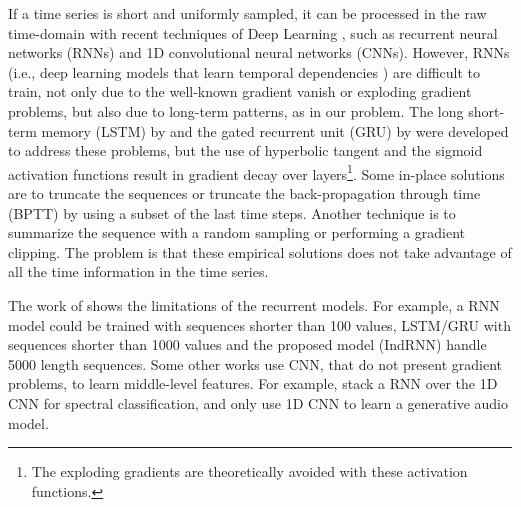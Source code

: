 If a time series is short and uniformly sampled, it can be processed in the raw time-domain with recent techniques of Deep Learning \citep{gamboa2017deep}, such as recurrent neural networks (RNNs) and 1D convolutional neural networks (CNNs).
However, RNNs (i.e., deep learning models that learn temporal dependencies \citep{lipton2015critical}) are difficult to train, not only due to the well-known gradient vanish or exploding gradient problems, but also due to long-term patterns, as in our problem. The long short-term memory (LSTM) by \citet{hochreiter1997long} and the gated recurrent unit (GRU) by \citep{cho2014properties} were developed to address these problems, but the use of hyperbolic tangent and the sigmoid activation functions result in gradient decay over layers\footnote{The exploding gradients are theoretically avoided with these activation functions.}. Some in-place solutions are to truncate the sequences or truncate the back-propagation through time (BPTT) \citep{werbos1990backpropagation} by using a subset of the last time steps. Another technique is to summarize the sequence with a random sampling or performing a gradient clipping. The problem is that these empirical solutions does not take advantage of all the time information in the time series.

The work of \citet{li2018independently} shows the limitations of the recurrent models. For example, a RNN model could be trained with sequences shorter than 100 values, LSTM/GRU with sequences shorter than 1000 values and the proposed model (IndRNN) handle 5000 length sequences. Some other works use CNN, that do not present gradient problems, to learn middle-level features. For example, \citet{wu2017convolutional} stack a RNN over the 1D CNN for spectral classification, and \citep{oord2016wavenet} only use 1D CNN to learn a generative audio model. %
